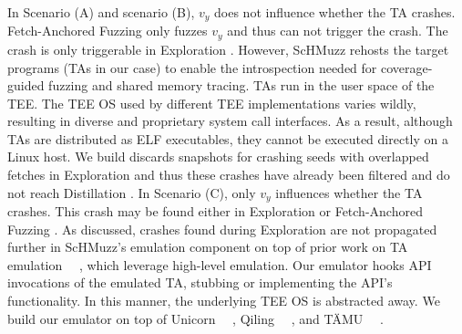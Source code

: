 \documentclass[conference]{IEEEtran} %
\newcommand{\sysname}{ScHMuzz\xspace}
\newcommand{\stageone}{Exploration\xspace}
\newcommand{\stagetwo}{Fetch-Anchored Fuzzing\xspace} %
\newcommand{\stagethree}{Distillation\xspace}
\providecommand{\DIFaddtex}[1]{{\protect\color{blue} \sf #1}} %
\providecommand{\DIFdeltex}[1]{{\protect\color{red} \scriptsize #1}} %
\providecommand{\DIFaddbegin}{} %
\providecommand{\DIFaddend}{} %
\providecommand{\DIFdelbegin}{} %
\providecommand{\DIFdelend}{} %
\providecommand{\DIFadd}[1]{\texorpdfstring{\DIFaddtex{#1}}{#1}} %
\providecommand{\DIFdel}[1]{\texorpdfstring{\DIFdeltex{#1}}{}} %
\begin{document}
\DIFadd{In Scenario (A) and scenario (B), $v_y$ does not influence whether the TA crashes. 
}\stagetwo \DIFadd{only fuzzes $v_y$ and thus 
can not trigger the crash. The crash is only triggerable in 
}\stageone\DIFadd{. However, }\DIFaddend \sysname \DIFdelbegin \DIFdel{rehosts the target programs (TAs in our case) to enable the introspection 
needed for coverage-guided fuzzing and shared memory tracing.
TAs run in the user space of the TEE. The TEE OS used by 
different TEE implementations varies wildly, resulting in diverse and proprietary system call 
interfaces. As a result, although TAs are distributed as ELF executables, they cannot 
be executed directly on a Linux host.
We build }\DIFdelend \DIFaddbegin \DIFadd{discards snapshots for crashing seeds with overlapped fetches in }\stageone 
\DIFadd{and thus these crashes have already been filtered and do not reach }\stagethree\DIFadd{.
In Scenario (C), only $v_y$ influences whether the TA crashes. This crash may be found 
either in }\stageone \DIFadd{or }\stagetwo\DIFadd{. As discussed, crashes found during }\stageone \DIFadd{are not 
propagated further in }\DIFaddend \sysname's \DIFdelbegin \DIFdel{emulation component on top of prior work on TA emulation~\mbox{%
\cite{taemu,busch2020finding,fan2025qsee,qseecyberes,Thalium2023PivotingSecureWorld,Komaromy2021UnboxYourPhone,AdamskiGuilbonPeterlin2019SamsungTrustZone,Li2024DiveIntoAndroidTA}}\hskip0pt%
, 
which leverage high-level emulation. Our emulator hooks API invocations of the emulated TA, 
stubbing or implementing the API's functionality. In this manner, the underlying TEE OS is abstracted away. 
We build our emulator on top of Unicorn~\mbox{%
\cite{unicorn}}\hskip0pt%
, Qiling~\mbox{%
\cite{qiling}}\hskip0pt%
, and TÄMU~\mbox{%
\cite{taemu}}\hskip0pt%
. 
}%
\end{document}
